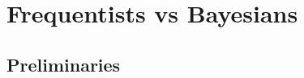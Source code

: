 \documentclass{article}
\begin{document}
\section{Frequentists vs Bayesians}
\subsection{Preliminaries}

    

\end{document}
